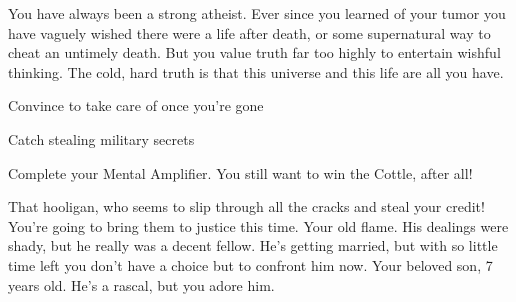 \documentclass[char]{guildcamp1}
\begin{document}
You have always been a strong atheist.  Ever since you learned of your tumor you have vaguely wished there were a life after death, or some supernatural way to cheat an untimely death.  But you value truth far too highly to entertain wishful thinking.  The cold, hard truth is that this universe and this life are all you have.



\begin{itemz}[Goals]
  \item Convince \cGroomA{} to take care of \cKid{} once you're gone
  \item Catch \cRival{} stealing military secrets
  \item Complete your Mental Amplifier. You still want to win the Cottle, after all!
\end{itemz}

\begin{contacts}
  \contact{\cRival{}} That hooligan, who seems to slip through all the cracks and steal your credit! You're going to bring them to justice this time.
  \contact{\cGroomA{}} Your old flame. His dealings were shady, but he really was a decent fellow. He's getting married, but with so little time left you don't have a choice but to confront him now.
    \contact{\cKid{}} Your beloved son, 7 years old. He's a rascal, but you adore him.
\end{contacts}
\end{document}
